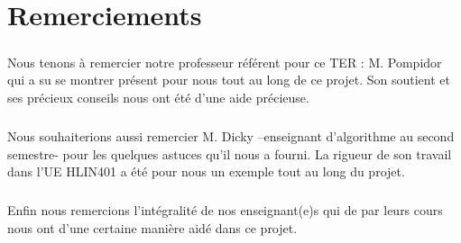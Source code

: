 \chapter{Remerciements}\label{chap:remerciements}
    \paragraph{}Nous tenons à remercier notre professeur référent pour ce TER : M. Pompidor qui a su se montrer présent pour nous tout au long de ce projet. Son soutient et ses précieux conseils nous ont été d’une aide précieuse.
    
    \paragraph{}Nous souhaiterions aussi remercier M. Dicky –enseignant d’algorithme au second semestre- pour les quelques astuces qu’il nous a fourni. La rigueur de son travail dans l’UE HLIN401 a été pour nous un exemple tout au long du projet.
    
    \paragraph{}Enfin nous remercions l’intégralité de nos enseignant(e)s qui de par leurs cours nous ont d’une certaine manière aidé dans ce projet.